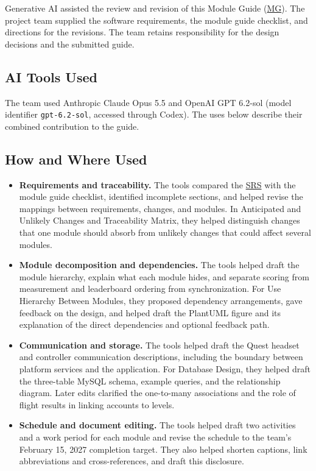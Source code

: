 \documentclass[12pt, titlepage]{article}
\DeclareRobustCommand{\mgabbr}[2]{\hyperlink{mg-abbr:#1}{#2}}
\begin{document}
Generative AI assisted the review and revision of this Module Guide
(\mgabbr{mg}{MG}). The project team supplied the software requirements,
the module guide checklist, and directions for the revisions. The team
retains responsibility for the design decisions and the submitted guide.

\subsection{AI Tools Used}

The team used Anthropic Claude Opus 5.5 and OpenAI GPT 6.2-sol
(model identifier \texttt{gpt-6.2-sol}, accessed through Codex).
The uses below describe their combined contribution to the guide.

\subsection{How and Where Used}

\begin{itemize}
\item \textbf{Requirements and traceability.} The tools compared the
\mgabbr{srs}{SRS} with the module guide checklist, identified incomplete
sections, and helped revise the mappings between requirements, changes,
and modules. In Anticipated and Unlikely Changes and Traceability Matrix,
they helped distinguish changes that one module should absorb from
unlikely changes that could affect several modules.

\item \textbf{Module decomposition and dependencies.} The tools helped
draft the module hierarchy, explain what each module hides, and separate
scoring from measurement and leaderboard ordering from synchronization.
For Use Hierarchy Between Modules, they proposed dependency arrangements,
gave feedback on the design, and helped draft the PlantUML figure and
its explanation of the direct dependencies and optional feedback path.

\item \textbf{Communication and storage.} The tools helped draft the
Quest headset and controller communication descriptions, including the
boundary between platform services and the application. For Database
Design, they helped draft the three-table MySQL schema, example queries,
and the relationship diagram. Later edits clarified the one-to-many
associations and the role of flight results in linking accounts to levels.

\item \textbf{Schedule and document editing.} The tools helped draft two
activities and a work period for each module and revise the schedule to
the team's February 15, 2027 completion target. They also helped shorten
captions, link abbreviations and cross-references, and draft this disclosure.
\end{itemize}
\end{document}
